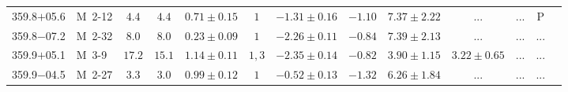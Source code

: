 \documentclass[useAMS]{mn2e}
\begin{document}
\begin{center}
{\begin{longtable}{llccccccccccc}
359.8$+$05.6&M~2-12&$       4.4$&$       4.4$&$0.71 \pm 0.15$&$1$&$-1.31 \pm 0.16$&$     -1.10$&$7.37 \pm 2.22$&$...$&$...$&P\\
359.8$-$07.2&M~2-32&$       8.0$&$       8.0$&$0.23 \pm 0.09$&$1$&$-2.26 \pm 0.11$&$     -0.84$&$7.39 \pm 2.13$&$...$&$...$&...\\
359.9$+$05.1&M~3-9&$      17.2$&$      15.1$&$1.14 \pm 0.11$&$1,3$&$-2.35 \pm 0.14$&$     -0.82$&$3.90 \pm 1.15$&$3.22 \pm 0.65$&$...$&...\\
359.9$-$04.5&M~2-27&$       3.3$&$       3.0$&$0.99 \pm 0.12$&$1$&$-0.52 \pm 0.13$&$     -1.32$&$6.26 \pm 1.84$&$...$&$...$&...\\
\end{longtable}
}
\end{center}
\end{document}

